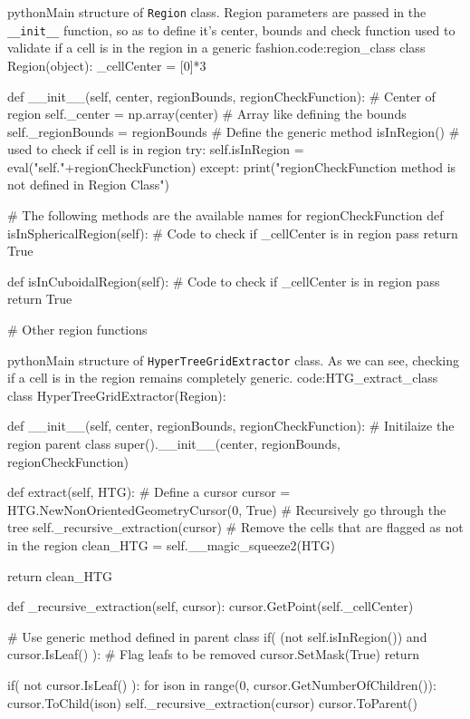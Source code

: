\documentclass[
	a4paper,
	12pt,
	raggedright,
	twoside
]{tufte-style-article}
\theoremstyle{definition}
\theoremstyle{remark}
\begin{document}
\begin{snippetnum}{python}{Main structure of \texttt{Region} class. Region parameters are passed in the \texttt{\_\_init\_\_} function, so as to define it's center, bounds and check function used to validate if a cell is in the region in a generic fashion.}{code:region_class}
class Region(object):
  _cellCenter = [0]*3

  def __init__(self, center, regionBounds, regionCheckFunction):
    # Center of region
    self._center = np.array(center)
    # Array like defining the bounds
    self._regionBounds = regionBounds
    # Define the generic method isInRegion()
    # used to check if cell is in region
    try:
      self.isInRegion = eval("self."+regionCheckFunction)
    except:
      print("regionCheckFunction method is not defined in Region Class")

  # The following methods are the available names for regionCheckFunction
  def isInSphericalRegion(self):
    # Code to check if _cellCenter is in region
    pass
    return True

  def isInCuboidalRegion(self):
    # Code to check if _cellCenter is in region
    pass
    return True

  # Other region functions

\end{snippetnum}


\begin{snippetnum}{python}{Main structure of \texttt{HyperTreeGridExtractor} class. As we can see, checking if a cell is in the region remains completely generic. }{code:HTG_extract_class}
class HyperTreeGridExtractor(Region):

  def __init__(self, center, regionBounds, regionCheckFunction):
    # Initilaize the region parent class
    super().__init__(center, regionBounds, regionCheckFunction)

  def extract(self, HTG):
    # Define a cursor
    cursor = HTG.NewNonOrientedGeometryCursor(0, True)
    # Recursively go through the tree
    self._recursive_extraction(cursor)
    # Remove the cells that are flagged as not in the region
    clean_HTG = self.__magic_squeeze2(HTG)

    return clean_HTG

  def _recursive_extraction(self, cursor):
    cursor.GetPoint(self._cellCenter)

    # Use generic method defined in parent class
    if( (not self.isInRegion()) and cursor.IsLeaf() ):
      # Flag leafs to be removed
      cursor.SetMask(True)
      return

    if( not cursor.IsLeaf() ):
      for ison in range(0, cursor.GetNumberOfChildren()):
        cursor.ToChild(ison)
        self._recursive_extraction(cursor)
        cursor.ToParent()

\end{snippetnum}
\end{document}
